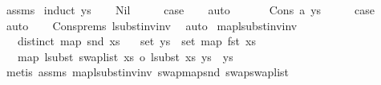 \begin{isabellebody}
%
\isadelimproof
%
\endisadelimproof
%
\isatagproof
{}\isamarkupfalse%
\ assms\isanewline
{}\isamarkupfalse%
\ {\isacharparenleft}{\kern0pt}induct\ ys{\isacharparenright}{\kern0pt}\isanewline
\ \ \isamarkupfalse%
\ Nil\isanewline
\ \ \isamarkupfalse%
\ \isamarkupfalse%
\ {\isacharquery}{\kern0pt}case\isanewline
\ \ \isamarkupfalse%
\ auto\isanewline
\ \ \isamarkupfalse%
\isanewline
{}\isamarkupfalse%
\isanewline
\ \ \isamarkupfalse%
\ {\isacharparenleft}{\kern0pt}Cons\ a\ ys{\isacharparenright}{\kern0pt}\isanewline
\ \ \isamarkupfalse%
\ \isamarkupfalse%
\ {\isacharquery}{\kern0pt}case\isanewline
\ \ \isamarkupfalse%
\ auto\isanewline
\ \ \isamarkupfalse%
\ Cons{\isachardot}{\kern0pt}prems{\isacharparenleft}{\kern0pt}{}{\isacharparenright}{\kern0pt}\ lsubst{\isacharunderscore}{\kern0pt}inv{\isacharunderscore}{\kern0pt}inv\ \isamarkupfalse%
\ auto\isanewline
{}\isamarkupfalse%
%
\endisatagproof
{\isafoldproof}%
%
\isadelimproof
\isanewline
%
\endisadelimproof
\isanewline
\isanewline
{}\isamarkupfalse%
\ map{\isacharunderscore}{\kern0pt}lsubst{\isacharunderscore}{\kern0pt}inv{\isacharunderscore}{\kern0pt}inv{}{\isacharcolon}{\kern0pt}\isanewline
\ \ \ {\isachardoublequoteopen}distinct\ {\isacharparenleft}{\kern0pt}map\ snd\ xs{\isacharparenright}{\kern0pt}{\isachardoublequoteclose}\isanewline
\ \ \ {\isachardoublequoteopen}set\ ys\ {\isasymsubseteq}\ set\ {\isacharparenleft}{\kern0pt}map\ fst\ xs{\isacharparenright}{\kern0pt}{\isachardoublequoteclose}\isanewline
\ \ \ {\isachardoublequoteopen}map\ {\isacharparenleft}{\kern0pt}lsubst\ {\isacharparenleft}{\kern0pt}swap{\isacharunderscore}{\kern0pt}list\ xs{\isacharparenright}{\kern0pt}\ o\ lsubst\ xs{\isacharparenright}{\kern0pt}\ ys\ {\isacharequal}{\kern0pt}\ ys{\isachardoublequoteclose}\isanewline
%
\isadelimproof
%
\endisadelimproof
%
\isatagproof
{}\isamarkupfalse%
\ {\isacharparenleft}{\kern0pt}metis\ assms{\isacharparenleft}{\kern0pt}{}{\isacharcomma}{\kern0pt}{}{\isacharparenright}{\kern0pt}\ map{\isacharunderscore}{\kern0pt}lsubst{\isacharunderscore}{\kern0pt}inv{\isacharunderscore}{\kern0pt}inv\ swap{\isacharunderscore}{\kern0pt}map{\isacharunderscore}{\kern0pt}snd\ swap{\isacharunderscore}{\kern0pt}swap{\isacharunderscore}{\kern0pt}list{\isacharparenright}{\kern0pt}%

\end{isabellebody}
